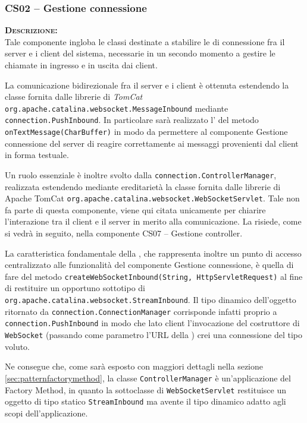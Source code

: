 \subsubsection{CS02 -- Gestione connessione}\label{sec:cs02}
\begin{description}
	\item{\scshape\bfseries Descrizione:}\\
Tale componente ingloba le classi destinate a stabilire le  di connessione fra il server e i client del sistema, necessarie in un secondo momento a gestire le chiamate in ingresso e in uscita dai client.

La comunicazione bidirezionale fra il server e i client è ottenuta estendendo la classe fornita dalle librerie di \textit{TomCat} \texttt{org.apache.catalina.websocket.MessageInbound} mediante \texttt{connection.PushInbound}. In particolare sarà realizzato l' del metodo \texttt{onTextMessage(CharBuffer)} in modo da permettere al componente \textsf{Gestione connessione} del server di reagire correttamente ai messaggi provenienti dal client in forma testuale.

Un ruolo essenziale è inoltre svolto dalla  \texttt{connection.ControllerManager}, realizzata estendendo mediante ereditarietà la classe fornita dalle librerie di Apache TomCat \texttt{org.apache.catalina.websocket.WebSocketServlet}. Tale  non fa parte di questa componente, viene qui citata unicamente per chiarire l'interazione tra il client e il server in merito alla comunicazione. La  risiede, come si vedrà in seguito, nella componente \textsf{CS07 -- Gestione controller}.

La caratteristica fondamentale della , che rappresenta inoltre un punto di accesso centralizzato alle funzionalità del componente \textsf{Gestione connessione}, è quella di fare  del metodo \texttt{createWebSocketInbound(String, HttpServletRequest)} al fine di restituire un opportuno sottotipo di \texttt{org.apache.catalina.websocket.StreamInbound}. Il tipo dinamico dell'oggetto ritornato da \texttt{connection.ConnectionManager} corrisponde infatti proprio a \texttt{connection.PushInbound} in modo che lato client l'invocazione del costruttore di \texttt{WebSocket} (passando come parametro l'URL della ) crei una connessione del tipo voluto.

Ne consegue che, come sarà esposto con maggiori dettagli nella sezione \vref{sec:patternfactorymethod}, la classe \texttt{ControllerManager} è un'applicazione del  Factory Method, in quanto la sottoclasse di \texttt{WebSocketServlet} restituisce un oggetto di tipo statico \texttt{StreamInbound} ma avente il tipo dinamico adatto agli scopi dell'applicazione.


\end{description}
